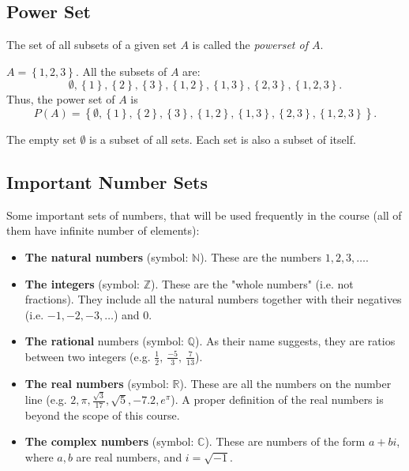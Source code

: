 \subsection{Power Set}
The set of all subsets of a given set $A$ is called the \emph{powerset of $A$}.
\begin{example}
  $A=\left\{ 1,2,3 \right\}$. All the subsets of $A$ are:
  \begin{equation*}
  \emptyset, \left\{ 1 \right\}, \left\{ 2 \right\}, \left\{ 3 \right\}, \left\{ 1,2 \right\}, \left\{ 1,3 \right\}, \left\{ 2,3 \right\}, \left\{ 1,2,3 \right\}.
  \end{equation*}
  Thus, the power set of $A$ is
  \begin{equation*}
  P(A) = \left\{ \emptyset, \left\{ 1 \right\}, \left\{ 2 \right\}, \left\{ 3 \right\}, \left\{ 1,2 \right\}, \left\{ 1,3 \right\}, \left\{ 2,3 \right\}, \left\{ 1,2,3 \right\} \right\}.
  \end{equation*}
\end{example}
\begin{warning}
  The empty set $\emptyset$ is a subset of all sets. Each set is also a subset of itself.
\end{warning}

\subsection{Important Number Sets}
Some important sets of numbers, that will be used frequently in the course (all of them have infinite number of elements):
\begin{itemize}
  \item \textbf{The natural numbers} (symbol: $\mathbb{N}$). These are the numbers $1,2,3,\dots$.
  \item \textbf{The integers} (symbol: $\mathbb{Z}$). These are the "whole numbers" (i.e. not fractions). They include all the natural numbers together with their negatives (i.e. $-1,-2,-3,\dots$) and $0$.
  \item \textbf{The rational} numbers (symbol: $\mathbb{Q}$). As their name suggests, they are ratios between two integers (e.g. $\frac{1}{2},\ \frac{-5}{3},\ \frac{7}{13}$).
  \item \textbf{The real numbers} (symbol: $\mathbb{R}$). These are all the numbers on the number line (e.g. $2, \pi, \frac{\sqrt{3}}{17}, \sqrt{5}, -7.2, e^{\pi}$). A proper definition of the real numbers is beyond the scope of this course.
  \item \textbf{The complex numbers} (symbol: $\mathbb{C}$). These are numbers of the form $a+bi$, where $a,b$ are real numbers, and $i=\sqrt{-1}$.
\end{itemize}
~\\~\\

